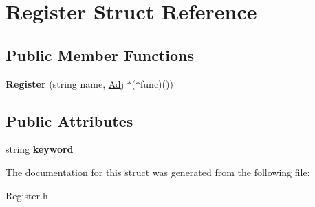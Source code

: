 \hypertarget{struct_register}{}\section{Register Struct Reference}
\label{struct_register}
\subsection*{Public Member Functions}
\begin{DoxyCompactItemize}
\item 
\mbox{\label{struct_register_ae4aeeaaefcbac30c5fc69df508afcabb}} 
{\bfseries Register} (string name, \hyperlink{class_adj}{Adj} $\ast$($\ast$func)())
\end{DoxyCompactItemize}
\subsection*{Public Attributes}
\begin{DoxyCompactItemize}
\item 
\mbox{\label{struct_register_a590c76fe1eaf40599a1ebf808249cb4d}} 
string {\bfseries keyword}
\end{DoxyCompactItemize}


The documentation for this struct was generated from the following file\+:\begin{DoxyCompactItemize}
\item 
Register.\+h\end{DoxyCompactItemize}
